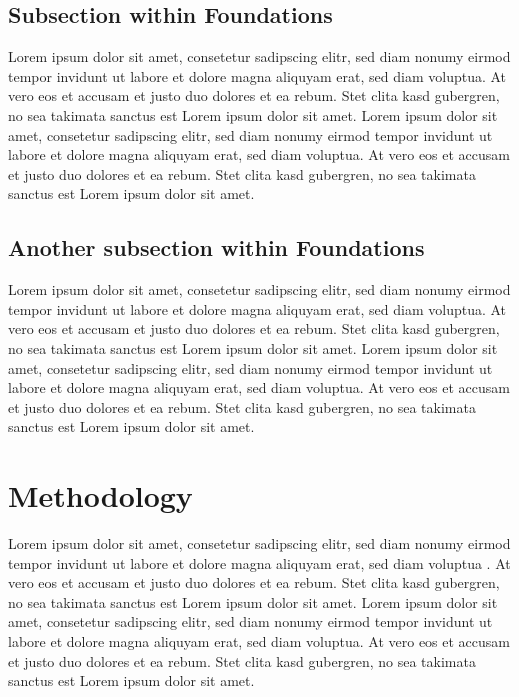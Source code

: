 \documentclass[a4paper]{article}
\begin{document}

\subsection{Subsection within Foundations} %
\label{sub:subsection_within_foundations}
Lorem ipsum dolor sit amet, consetetur sadipscing elitr, sed diam nonumy eirmod tempor invidunt ut labore et dolore magna aliquyam erat, sed diam voluptua. At vero eos et accusam et justo duo dolores et ea rebum. Stet clita kasd gubergren, no sea takimata sanctus est Lorem ipsum dolor sit amet. Lorem ipsum dolor sit amet, consetetur sadipscing elitr, sed diam nonumy eirmod tempor invidunt ut labore et dolore magna aliquyam erat, sed diam voluptua. At vero eos et accusam et justo duo dolores et ea rebum. Stet clita kasd gubergren, no sea takimata sanctus est Lorem ipsum dolor sit amet.

\subsection{Another subsection within Foundations} %
\label{sub:another_subsection_within_foundations}
Lorem ipsum dolor sit amet, consetetur sadipscing elitr, sed diam nonumy eirmod tempor invidunt ut labore et dolore magna aliquyam erat, sed diam voluptua. At vero eos et accusam et justo duo dolores et ea rebum. Stet clita kasd gubergren, no sea takimata sanctus est Lorem ipsum dolor sit amet. Lorem ipsum dolor sit amet, consetetur sadipscing elitr, sed diam nonumy eirmod tempor invidunt ut labore et dolore magna aliquyam erat, sed diam voluptua. At vero eos et accusam et justo duo dolores et ea rebum. Stet clita kasd gubergren, no sea takimata sanctus est Lorem ipsum dolor sit amet.



\section{Methodology} %
\label{sec:methodology}
Lorem ipsum dolor sit amet, consetetur sadipscing elitr, sed diam nonumy eirmod tempor invidunt ut labore et dolore magna aliquyam erat, sed diam voluptua \citep{Dix04}. At vero eos et accusam et justo duo dolores et ea rebum. Stet clita kasd gubergren, no sea takimata sanctus est Lorem ipsum dolor sit amet. Lorem ipsum dolor sit amet, consetetur sadipscing elitr, sed diam nonumy eirmod tempor invidunt ut labore et dolore magna aliquyam erat, sed diam voluptua. At vero eos et accusam et justo duo dolores et ea rebum. Stet clita kasd gubergren, no sea takimata sanctus est Lorem ipsum dolor sit amet.
\end{document}
